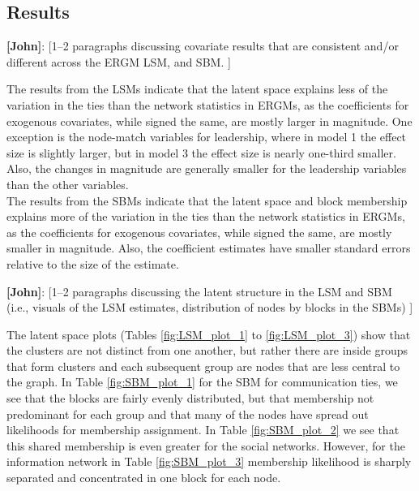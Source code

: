 \documentclass[fleqn,12pt]{wlscirep}
\begin{document}
\subsection{Results}

 {\bf [John]}: [1--2 paragraphs discussing covariate results that are consistent and/or different across the ERGM LSM, and SBM. ]

The results from the LSMs indicate that the latent space explains less of the variation in the ties than the network statistics in ERGMs, as the coefficients for exogenous covariates, while signed the same, are mostly larger in magnitude. One exception is the node-match variables for leadership, where in model 1 the effect size is slightly larger, but in model 3 the effect size is nearly one-third smaller. Also, the changes in magnitude are generally smaller for the leadership variables than the other variables.\\

The results from the SBMs indicate that the latent space and block membership explains more of the variation in the ties than the network statistics in ERGMs, as the coefficients for exogenous covariates, while signed the same, are mostly smaller in magnitude. Also, the coefficient estimates have smaller standard errors relative to the size of the estimate.


 {\bf [John]}: [1--2 paragraphs discussing the latent structure in the LSM and SBM (i.e., visuals of the LSM estimates, distribution of nodes by blocks in the SBMs) ]

The latent space plots (Tables \ref{fig:LSM_plot_1} to  \ref{fig:LSM_plot_3}) show that the clusters are not distinct from one another, but rather there are inside groups that form clusters and each subsequent group are nodes that are less central to the graph. In Table \ref{fig:SBM_plot_1} for the SBM for communication ties, we see that the blocks are fairly evenly distributed, but that membership not predominant for each group and that many of the nodes have spread out likelihoods for  membership assignment. In Table \ref{fig:SBM_plot_2} we see that this shared membership is even greater for the social networks. However, for the information network in Table  \ref{fig:SBM_plot_3} membership likelihood is sharply separated and concentrated in one block for each node.
\end{document}

